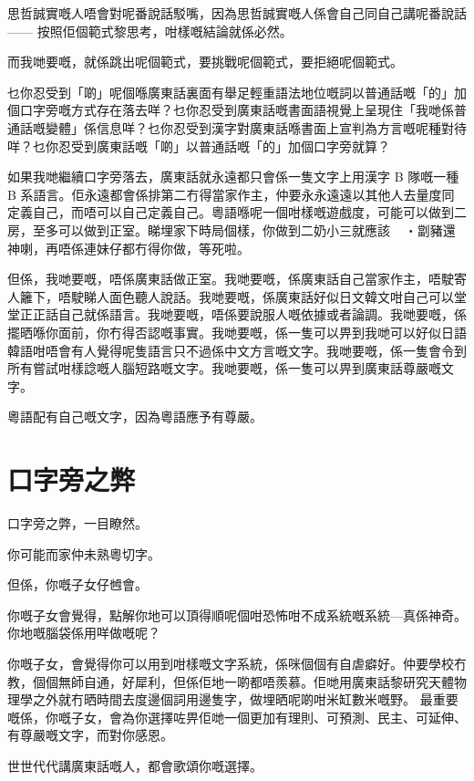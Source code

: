 思哲誠實嘅人唔會對呢番說話駁嘴，因為思哲誠實嘅人係會自己同自己講呢番說話—— 按照佢個範式黎思考，咁樣嘅結論就係必然。

而我哋要嘅，就係跳出呢個範式，要挑戰呢個範式，要拒絕呢個範式。

乜你忍受到「啲」呢個喺廣東話裏面有舉足輕重語法地位嘅詞以普通話嘅「的」加個口字旁嘅方式存在落去咩？乜你忍受到廣東話嘅書面語視覺上呈現住「我哋係普通話嘅變體」係信息咩？乜你忍受到漢字對廣東話喺書面上宣判為方言嘅呢種對待咩？乜你忍受到廣東話嘅「啲」以普通話嘅「的」加個口字旁就算？

如果我哋繼續口字旁落去，廣東話就永遠都只會係一隻文字上用漢字 B 隊嘅一種 B 系語言。佢永遠都會係排第二冇得當家作主，仲要永永遠遠以其他人去量度同定義自己，而唔可以自己定義自己。粵語喺呢一個咁樣嘅遊戲度，可能可以做到二房，至多可以做到正室。睇埋家下時局個樣，你做到二奶小三就應該・劏豬還神喇，再唔係連妹仔都冇得你做，等死啦。

但係，我哋要嘅，唔係廣東話做正室。我哋要嘅，係廣東話自己當家作主，唔駛寄人籬下，唔駛睇人面色聽人說話。我哋要嘅，係廣東話好似日文韓文咁自己可以堂堂正正話自己就係語言。我哋要嘅，唔係要說服人嘅依據或者論調。我哋要嘅，係擺晒喺你面前，你冇得否認嘅事實。我哋要嘅，係一隻可以畀到我哋可以好似日語韓語咁唔會有人覺得呢隻語言只不過係中文方言嘅文字。我哋要嘅，係一隻會令到所有嘗試咁樣諗嘅人腦短路嘅文字。我哋要嘅，係一隻可以畀到廣東話尊嚴嘅文字。

粵語配有自己嘅文字，因為粵語應予有尊嚴。


\section{口字旁之弊}
口字旁之弊，一目瞭然。

你可能而家仲未熟粵切字。

但係，你嘅子女仔乸會。

你嘅子女會覺得，點解你地可以頂得順呢個咁恐怖咁不成系統嘅系統—真係神奇。你地嘅腦袋係用咩做嘅呢？

你嘅子女，會覺得你可以用到咁樣嘅文字系統，係咪個個有自虐癖好。仲要學校冇教，個個無師自通，好犀利，但係佢地一啲都唔羨慕。佢哋用廣東話黎研究天體物理學之外就冇晒時間去度邊個詞用邊隻字，做埋晒呢啲咁米缸數米嘅野。
最重要嘅係，你嘅子女，會為你選擇咗畀佢哋一個更加有理則、可預測、民主、可延伸、有尊嚴嘅文字，而對你感恩。

世世代代講廣東話嘅人，都會歌頌你嘅選擇。

